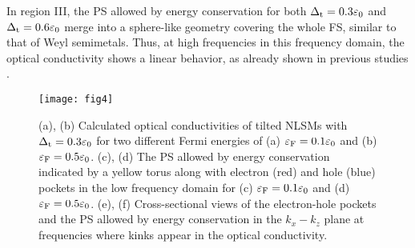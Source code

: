\documentclass[aps,twocolumn,floatfix]{revtex4-1}
\begin{document}

In region III, the PS allowed by energy conservation for both $\Delta_{\rm t}=0.3\varepsilon_0$ and $\Delta_{\rm t}=0.6\varepsilon_0$ merge into a sphere-like geometry covering the whole FS, similar to that of Weyl semimetals. Thus, at high frequencies in this frequency domain, the optical conductivity shows a linear behavior, as already shown in previous studies \cite{Carbotte2017}.

\begin{figure}[!htb]
\texttt{[image: fig4]}
\caption{
(a), (b) Calculated optical conductivities of tilted NLSMs with $\Delta_{\rm t}=0.3\varepsilon_0$ for two different Fermi energies of (a) $\varepsilon_{\rm F}=0.1\varepsilon_0$ and (b) $\varepsilon_{\rm F}=0.5\varepsilon_0$. (c), (d) The PS allowed by energy conservation indicated by a yellow torus along with electron (red) and hole (blue) pockets in the low frequency domain for (c) $\varepsilon_{\rm F}=0.1\varepsilon_0$ and (d) $\varepsilon_{\rm F}=0.5\varepsilon_0$. 
(e), (f) Cross-sectional views of the electron-hole pockets and the PS allowed by energy conservation in the $k_x-k_z$ plane at frequencies where kinks appear in the optical conductivity.
}
\label{fig:optical_conductivity_Ef}
\end{figure}
\end{document}
